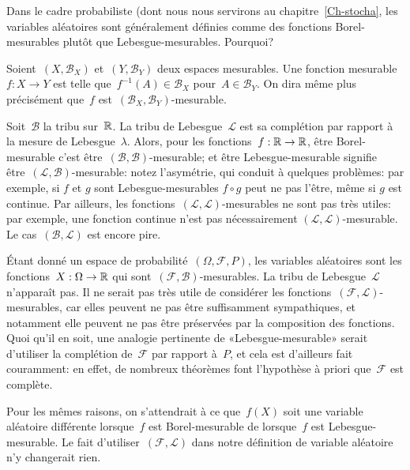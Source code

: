 \begin{remarque}
Dans le cadre probabiliste (dont nous nous servirons au chapitre~\ref{Ch-stocha}, les variables aléatoires sont généralement définies comme des fonctions Borel-mesurables plutôt que Lebesgue-mesurables. Pourquoi?

Soient~$(X,\mathcal{B}_X)$ et~$(Y,\mathcal{B}_Y)$ deux espaces mesurables.
Une fonction mesurable~$f: X\rightarrow Y$ est telle que~$f^{-1}(A)\in\mathcal{B}_X$ pour~$A\in\mathcal{B}_Y$. On dira même plus précisément que~$f$ est~$(\mathcal{B}_X,\mathcal{B}_Y)$-mesurable.

Soit~$\mathcal{B}$ la tribu sur~$\mathbb R$. La tribu de Lebesgue~$\mathcal{L}$ est sa complétion par rapport à la mesure de Lebesgue~$\lambda$. Alors, pour les fonctions~$f: \mathbb R\rightarrow\mathbb R$, être Borel-mesurable c'est être~$(\mathcal{B},\mathcal{B})$-mesurable; et être Lebesgue-mesurable signifie être~$(\mathcal{L},\mathcal{B})$-mesurable: notez l'asymétrie, qui conduit à quelques problèmes: par exemple, si $f$ et $g$ sont Lebesgue-mesurables $f\circ g$ peut ne pas l'être, même si $g$ est continue.%
Par ailleurs, les fonctions~$(\mathcal{L},\mathcal{L})$-mesurables ne sont pas très utiles: par exemple, une fonction continue n'est pas nécessairement $(\mathcal{L},\mathcal{L})$-mesurable. Le cas~$(\mathcal{B},\mathcal{L})$ est encore pire.

Étant donné un espace de probabilité~$(\Omega,\mathcal{F},P)$, les variables aléatoires sont les fonctions~$X: \Omega\rightarrow\mathbb R$ qui sont~$(\mathcal{F},\mathcal{B})$-mesurables. La tribu de Lebesgue~$\mathcal{L}$ n'apparaît pas. Il ne serait pas très utile de considérer les fonctions~$(\mathcal{F},\mathcal{L})$-mesurables, car elles peuvent ne pas être suffisamment sympathiques, et notamment elle peuvent ne pas être préservées par la composition des fonctions. Quoi qu'il en soit, une analogie pertinente de «Lebesgue-mesurable» serait d'utiliser la complétion de~$\mathcal{F}$ par rapport à~$P$, et cela est d'ailleurs fait couramment: en effet, de nombreux théorèmes font l'hypothèse à priori que~$\mathcal{F}$ est complète.

Pour les mêmes raisons, on s'attendrait à ce que~$f(X)$ soit une variable aléatoire différente lorsque~$f$ est Borel-mesurable de lorsque~$f$ est Lebesgue-mesurable. Le fait d'utiliser~$(\mathcal{F},\mathcal{L})$ dans notre définition de variable aléatoire n'y changerait rien.


\end{remarque}
